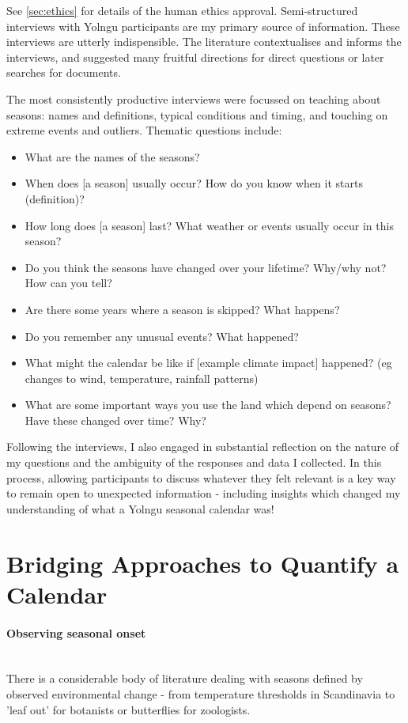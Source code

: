 See \autoref{sec:ethics} for details of the human ethics approval.
Semi-structured interviews with Yolngu participants are my primary source
of information.  These interviews are utterly indispensible.
The literature contextualises and informs the interviews, and suggested many fruitful
directions for direct questions or later searches for documents.

The most consistently productive interviews were focussed on teaching about
seasons: names and definitions, typical conditions and timing, and touching on
extreme events and outliers. Thematic questions include:
\begin{itemize}
\item What are the names of the seasons?
\item When does [a season] usually occur?  How do you know when it starts (definition)?
\item How long does [a season] last?  What weather or events usually occur in this season?
\item Do you think the seasons have changed over your lifetime?  Why/why not?  How can you tell?
\item Are there some years where a season is skipped?  What happens?
\item Do you remember any unusual events?  What happened?
\item What might the calendar be like if [example climate impact] happened? 
      (eg changes to wind, temperature, rainfall patterns) 
\item What are some important ways you use the land which depend on seasons?
        Have these changed over time?  Why?
\end{itemize}

Following the interviews, I also engaged in substantial reflection on the nature
of my questions and the ambiguity of the responses and data I collected.
In this process, allowing participants to discuss whatever they felt relevant
is a key way to remain open to unexpected information - including insights
which changed my understanding of what a Yolngu seasonal calendar was!






\section{Bridging Approaches to Quantify a Calendar}


\paragraph{Observing seasonal onset}~\\
There is a considerable body of literature dealing with seasons defined
by observed environmental change - from temperature thresholds in
Scandinavia to 'leaf out' for botanists or butterflies for zoologists.


